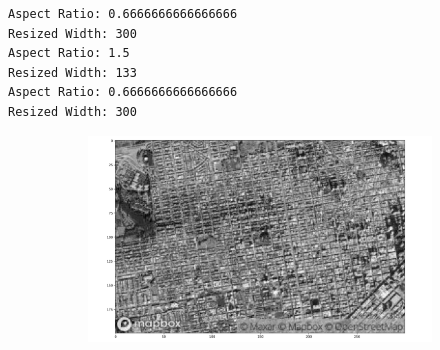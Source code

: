 \documentclass[
  letterpaper,
  DIV=11,
  numbers=noendperiod]{scrreprt}
\begin{document}
\begin{verbatim}
Aspect Ratio: 0.6666666666666666
Resized Width: 300
Aspect Ratio: 1.5
Resized Width: 133
Aspect Ratio: 0.6666666666666666
Resized Width: 300
\end{verbatim}

\begin{figure}

\begin{minipage}{0.33\linewidth}

\begin{figure}[H]

{\centering \includegraphics{images/plots/aerial_cities/0.jpg}

}


\end{figure}%

\end{minipage}%
%
\begin{minipage}{0.33\linewidth}

\begin{figure}[H]


\end{figure}
\end{minipage}
\end{figure}
\end{document}
